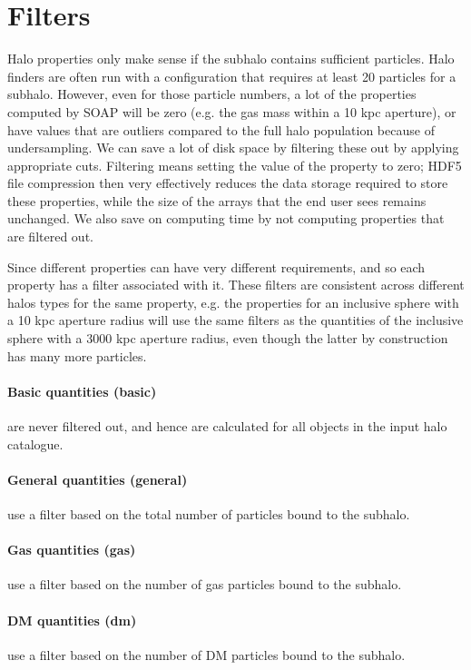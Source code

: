 \documentclass{article}
\begin{document}


\section{Filters}

Halo properties only make sense if the subhalo contains sufficient particles. Halo finders are often run with a 
configuration that requires at least 20 particles for a subhalo. 
However, even for those particle numbers, a lot of the properties computed by SOAP will be zero (e.g. 
the gas mass within a 10 kpc aperture), or have values that are outliers compared to the full halo population 
because of undersampling. We can save a lot of disk space by filtering these out by applying appropriate cuts. 
Filtering means setting the value of the property to zero; HDF5 file compression then very effectively 
reduces the data storage required to store these properties, while the size of the arrays that the end user 
sees remains unchanged. We also save on computing time by not computing properties that are 
filtered out.

Since different properties can have very different requirements, and so each property has a filter associated
with it. These filters are consistent across different halos types for the same property, e.g. the properties
for an inclusive sphere with a 10 kpc aperture radius will use the same filters as the quantities of the inclusive 
sphere with a 3000 kpc aperture radius, even 
though the latter by construction has many more particles.

\paragraph{Basic quantities (basic)} are never filtered out, and hence are calculated for all objects in the
input halo catalogue.

\paragraph{General quantities (general)} use a filter based on the total number of particles bound to the 
subhalo.

\paragraph{Gas quantities (gas)} use a filter based on the number of gas particles bound to the subhalo. 

\paragraph{DM quantities (dm)} use a filter based on the number of DM particles bound to the subhalo.
\end{document}
